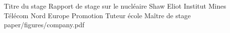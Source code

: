 \documentclass[a4paper,12pt]{report}
\begin{document}
\imtnepagedegarde
    {Titre du stage} %
    {Rapport de stage sur le nucléaire} %
    {Shaw Eliot} %
    {Institut Mines Télécom Nord Europe} %
    {Promotion} %
    {Tuteur école} %
    {Maître de stage} %
    {paper/figures/company.pdf} %

\tableofcontents
\clearpage

\end{document}
